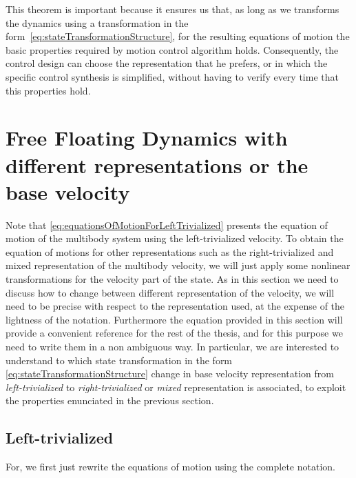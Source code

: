This theorem is important because it ensures us that, as long as we transforms the dynamics using a transformation in the form~\eqref{eq:stateTransformationStructure}, for the resulting equations of motion the basic properties required by motion control algorithm holds. Consequently, the control design can choose the representation that he prefers, or in which the specific control synthesis is simplified, without having to verify every time that this properties hold. 

\section{Free Floating Dynamics with different representations or the base velocity}
\label{sec:dynamicsWithDiffRepresentation}
Note that \eqref{eq:equationsOfMotionForLeftTrivialized} presents the equation of motion of the multibody system using the left-trivialized velocity. To obtain the equation of motions for other representations such as the right-trivialized and mixed representation of the multibody velocity, we will just apply some nonlinear transformations for the velocity part of the state. As in this section we need to discuss how to change between different representation of the velocity, we will need to be precise with respect to the representation used, at the expense of the lightness of the notation. Furthermore the equation provided in this section will provide a convenient reference for the rest of the thesis, and for this purpose we need to write them in a non ambiguous way.
In particular, we are interested to understand to which state transformation in the form \ref{eq:stateTransformationStructure} change in base velocity representation from \emph{left-trivialized} to \emph{right-trivialized} or \emph{mixed} representation is associated, to exploit the properties enunciated in the previous section. 

\subsection{Left-trivialized} 
For, we first just rewrite the equations of motion using the complete notation. 

